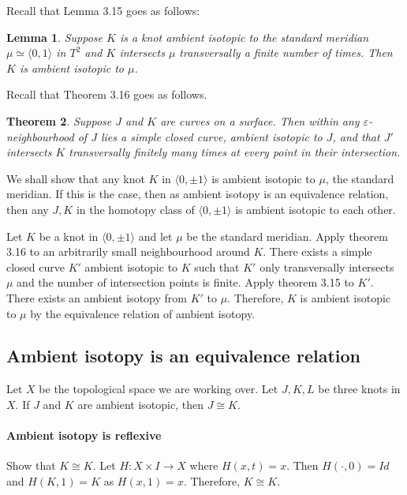 \documentclass{article}
\newtheorem{theorem}{Theorem}
\newtheorem{lemma}[theorem]{Lemma}
\theoremstyle{definition}
\numberwithin{theorem}{section}
\numberwithin{equation}{section}
\begin{document}
Recall that Lemma 3.15 goes as follows:
\begin{lemma}
    Suppose $K$ is a knot ambient isotopic to the standard meridian $\mu \simeq \langle 0, 1 \rangle$ in $T^2$ and $K$ intersects $\mu$ transversally a finite number of times. Then $K$ is ambient isotopic to $\mu$. 
\end{lemma}

Recall that Theorem 3.16 goes as follows.

\begin{theorem}
    Suppose $J$ and $K$ are curves on a surface. Then within any $\varepsilon$-neighbourhood of $J$ lies a simple closed curve, ambient isotopic to $J$, and that $J'$ intersects $K$ transversally finitely many times at every point in their intersection.
\end{theorem}

We shall show that any knot $K$ in $\langle 0, \pm 1 \rangle$ is ambient isotopic to $\mu$, the standard meridian. If this is the case, then as ambient isotopy is an equivalence relation, then any $J, K$ in the homotopy class of $\langle 0, \pm 1 \rangle$ is ambient isotopic to each other.

Let $K$ be a knot in $\langle 0, \pm 1 \rangle$ and let $\mu$ be the standard meridian. Apply theorem 3.16 to an arbitrarily small neighbourhood around $K$. There exists a simple closed curve $K'$ ambient isotopic to $K$ such that $K'$ only transversally intersects $\mu$ and the number of intersection points is finite. Apply theorem 3.15 to $K'$. There exists an ambient isotopy from $K'$ to $\mu$. Therefore, $K$ is ambient isotopic to $\mu$ by the equivalence relation of ambient isotopy.


\subsection{Ambient isotopy is an equivalence relation}
Let $X$ be the topological space we are working over. Let $J, K, L$ be three knots in $X$. If $J$ and $K$ are ambient isotopic, then $J \cong K$.
\paragraph{Ambient isotopy is reflexive}
Show that $K \cong K$. Let $H : X \times I \rightarrow X$ where $H(x, t) = x$. Then $H(\cdot, 0) = Id$ and $H(K, 1) = K$ as $H(x, 1) = x$. Therefore, $K \cong K$. 
\end{document}
